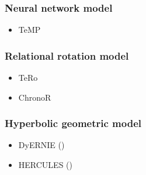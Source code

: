\documentclass[12pt]{article}
\begin{document}
\subsubsection{Neural network model}

\begin{itemize}
    \item TeMP
\end{itemize}

\subsubsection{Relational rotation model}

\begin{itemize}
    \item TeRo
    \item ChronoR
\end{itemize}

\subsubsection{Hyperbolic geometric model}

\begin{itemize}
    \item DyERNIE (\cite{han2020dyernie})
    \item HERCULES ()
\end{itemize}

\nocite{*}
\printbibliography
\end{document}
